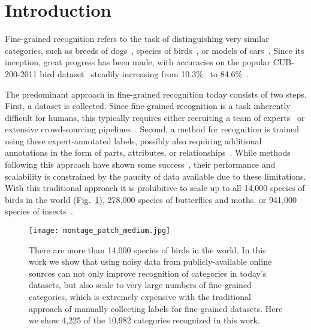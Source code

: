 \documentclass[runningheads]{llncs}
\begin{document}
\section{Introduction}
Fine-grained recognition refers to the task of distinguishing very similar categories, such as breeds of dogs~\cite{khosla2011novel,liu2012dog}, species of birds~\cite{wahcub2002011,horn2015,branson2014bird,bergbirdsnapcvpr2014}, or models of cars~\cite{yang2015large,krause20133d}.
Since its inception, great progress has been made, with accuracies on the popular CUB-200-2011 bird dataset~\cite{wahcub2002011} steadily increasing from 10.3\%~\cite{wahcub2002011} to 84.6\%~\cite{xu2015augmenting}.

The predominant approach in fine-grained recognition today consists of two steps.
First, a dataset is collected.
Since fine-grained recognition is a task inherently difficult for humans, this typically requires either recruiting a team of experts~\cite{horn2015,maji13finegrained} or extensive crowd-sourcing pipelines~\cite{krause20133d,bergbirdsnapcvpr2014}. 
Second, a method for recognition is trained using these expert-annotated labels, possibly also requiring additional annotations in the form of parts, attributes, or relationships~\cite{zhang2014part,jaderberg2015spatial,lin2015bilinear,branson2014bird}.
While methods following this approach have shown some success~\cite{branson2014bird,zhang2014part,lin2015bilinear,krause2014icpr}, their performance and scalability is constrained by the paucity of data available due to these limitations.
With this traditional approach it is prohibitive to scale up to all 14,000 species of birds in the world (Fig.~\ref{fig:pull}), 278,000 species of butterflies and moths, or 941,000 species of insects~\cite{Hinchliff18092015}.

\begin{figure}[t]
\centering
\texttt{[image: montage\_patch\_medium.jpg]}
\caption{
There are more than 14,000 species of birds in the world.
In this work we show that using noisy data from publicly-available online sources can not only improve recognition of categories in today's datasets, but also scale to very large numbers of fine-grained categories, which is extremely expensive with the traditional approach of manually collecting labels for fine-grained datasets.
Here we show 4,225 of the 10,982 categories recognized in this work.
}
\label{fig:pull}
\end{figure}
\end{document}
